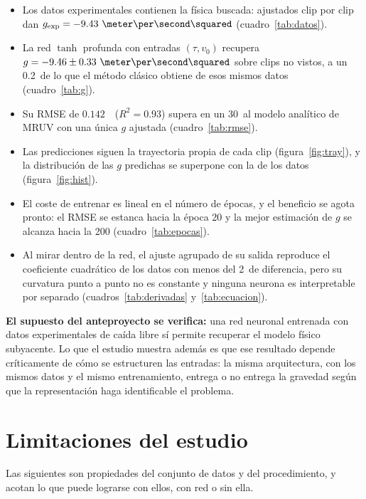 \documentclass[titlepage,11pt]{article}
\providecommand{\num}[1]{\ensuremath{#1}}
\providecommand{\SI}[2]{#1\,#2}
\providecommand{\percent}{\char37\relax}
\begin{document}
\begin{itemize}
\item Los datos experimentales contienen la física buscada: ajustados clip por
  clip dan $g_{\text{exp}}=\num{-9.43}~\meter\per\second\squared$
  (cuadro~\ref{tab:datos}).
\item La red $\tanh$ profunda con entradas $(\tau,v_0)$ recupera
  $g=\num{-9.46}\pm\num{0.33}~\meter\per\second\squared$ sobre clips no vistos,
  a un \SI{0.2}{\percent} de lo que el método clásico obtiene de esos mismos
  datos (cuadro~\ref{tab:g}).
\item Su RMSE de \num{0.142}~\meter\ ($R^2=\num{0.93}$) supera en un
  \SI{30}{\percent} al modelo analítico de MRUV con una única $g$ ajustada
  (cuadro~\ref{tab:rmse}).
\item Las predicciones siguen la trayectoria propia de cada clip
  (figura~\ref{fig:tray}), y la distribución de las $g$ predichas se superpone
  con la de los datos (figura~\ref{fig:hist}).
\item El coste de entrenar es lineal en el número de épocas, y el beneficio se
  agota pronto: el RMSE se estanca hacia la época 20 y la mejor estimación de
  $g$ se alcanza hacia la 200 (cuadro~\ref{tab:epocas}).
\item Al mirar dentro de la red, el ajuste agrupado de su salida reproduce el
  coeficiente cuadrático de los datos con menos del \SI{2}{\percent} de
  diferencia, pero su curvatura punto a punto no es constante y ninguna neurona
  es interpretable por separado (cuadros~\ref{tab:derivadas}
  y~\ref{tab:ecuacion}).
\end{itemize}

\textbf{El supuesto del anteproyecto se verifica:} una red neuronal entrenada
con datos experimentales de caída libre sí permite recuperar el modelo físico
subyacente. Lo que el estudio muestra además es que ese resultado depende
críticamente de cómo se estructuren las entradas: la misma arquitectura, con
los mismos datos y el mismo entrenamiento, entrega o no entrega la gravedad
según que la representación haga identificable el problema.


\section{Limitaciones del estudio}
\label{sec:limitaciones}

Las siguientes son propiedades del conjunto de datos y del procedimiento, y
acotan lo que puede lograrse con ellos, con red o sin ella.
\end{document}
